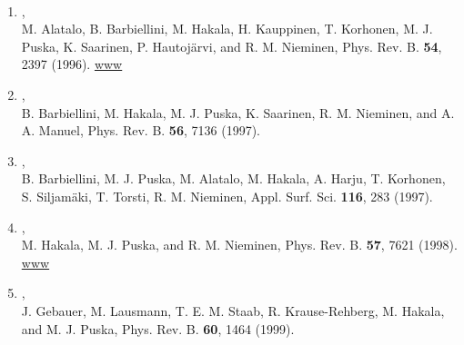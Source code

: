 \documentclass[12pt,a4]{report}
\begin{document}
\\


\begin{enumerate}

\item {},\\M. Alatalo, B. Barbiellini,
M. Hakala, H. Kauppinen, T. Korhonen, M. J. Puska, K. Saarinen,
P. Hautoj\"arvi, and R. M. Nieminen, Phys. Rev. B. {\bf 54}, 2397
(1996).
\href{http://journals.aps.org/prb/abstract/10.1103/PhysRevB.54.2397}{www}

\item {}, \\B. Barbiellini, M. Hakala, M. J. Puska, K. Saarinen,
R. M. Nieminen, and A. A. Manuel, Phys. Rev. B. {\bf 56}, 7136 (1997).

\item {},\\ B. Barbiellini, M. J. Puska, M. Alatalo, M. Hakala,
A. Harju, T. Korhonen, S. Siljam\"aki, T. Torsti, R. M. Nieminen,
 Appl. Surf. Sci. {\bf 116}, 283 (1997).

\item {}, \\M. Hakala, M. J. Puska,
 and R. M. Nieminen, Phys. Rev. B. {\bf 57}, 7621 (1998).
\href{http://journals.aps.org/prb/abstract/10.1103/PhysRevB.57.7621}{www}

\item {},\\J. Gebauer, M. Lausmann, T. E. M. Staab,
R. Krause-Rehberg, M. Hakala, and M. J. Puska, Phys. Rev. B. {\bf 60},
1464 (1999).


\end{enumerate}
\end{document}
